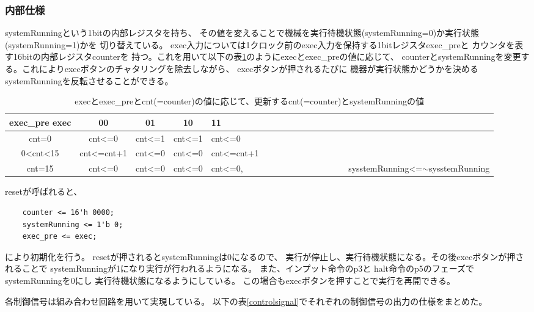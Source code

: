 \documentclass[a4j,titlepage]{jarticle}
\begin{document}
\subsubsection{内部仕様}
systemRunningという1bitの内部レジスタを持ち、
その値を変えることで機械を実行待機状態(systemRunning=0)か実行状態(systemRunning=1)かを
切り替えている。
exec入力については1クロック前のexec入力を保持する1bitレジスタexec\_preと
カウンタを表す16bitの内部レジスタcounterを
持つ。これを用いて以下の表\ref{execexecprecntsystemRunningRelation}のようにexecとexec\_preの値に応じて、
counterとsystemRunningを変更する。これによりexecボタンのチャタリングを除去しながら、
execボタンが押されるたびに
機器が実行状態かどうかを決めるsystemRunningを反転させることができる。


\begin{table}[H]
    \caption{execとexec\_preとcnt(=counter)の値に応じて、更新するcnt(=counter)とsystemRunningの値}
    \label{execexecprecntsystemRunningRelation}
    \begin{center}
    \begin {tabularx}{145mm}{|c||cccX|} \hline
         exec\_pre exec & 00 & 01 & 10 & 11 \\ \hline \hline
         cnt=0 & cnt\textless =0 & cnt\textless =1 & cnt\textless =1 & cnt\textless =0 \\ \hline
         0\textless cnt\textless 15 & cnt\textless =cnt+1 & cnt\textless =0 & cnt\textless =0 & cnt\textless =cnt+1 \\ \hline
         cnt=15 & cnt\textless =0 & cnt\textless =0 & cnt\textless =0 & cnt\textless =0,　　　　　　　　　　　　  sysstemRunning\textless =$\sim$sysstemRunning \\ \hline 

    \end {tabularx}
    \end{center}
\end{table}

resetが呼ばれると、
\begin{verbatim} 
    counter <= 16'h 0000;
    systemRunning <= 1'b 0;
    exec_pre <= exec;
\end{verbatim}
により初期化を行う。
resetが押されるとsystemRunningは0になるので、
実行が停止し、実行待機状態になる。その後execボタンが押されることで
systemRunningが1になり実行が行われるようになる。
また、インプット命令のp3と
halt命令のp5のフェーズでsystemRunningを0にし
実行待機状態になるようにしている。
この場合もexecボタンを押すことで実行を再開できる。


各制御信号は組み合わせ回路を用いて実現している。
以下の表\ref{controlsignal}でそれぞれの制御信号の出力の仕様をまとめた。
\end{document}
